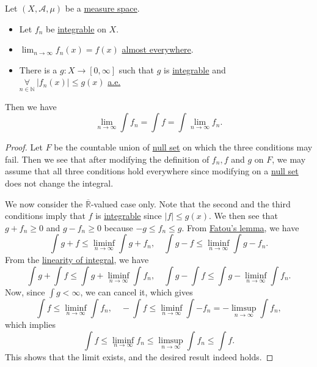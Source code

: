 \begin{theorem}\label{thm:DCT}
	Let \((X, \mathcal{A} , \mu )\) be a \hyperref[def:measure-space]{measure space}.
	\begin{itemize}
		\item Let \(f_{n}\) be \hyperref[def:integrable]{integrable} on \(X\).
		\item \(\lim_{n \to \infty} f_{n}(x) = f(x)\) \hyperref[def:mu-almost-everywhere]{almost everywhere}.
		\item There is a \(g\colon X\to [0, \infty ]\) such that \(g\) is \hyperref[def:integrable]{integrable} and \(\underset{n\in\mathbb{N} }{\forall }\ \left\vert f_{n}(x) \right\vert \leq g(x)\) \hyperref[def:mu-almost-everywhere]{a.e.}
	\end{itemize}
	Then we have
	\[
		\lim_{n \to \infty} \int f_{n} = \int f = \int \lim_{n \to \infty} f_{n}.
	\]
\end{theorem}
\begin{proof}
	Let \(F\) be the countable union of \hyperref[def:null-set]{null set} on which the three conditions may fail. Then we see that after modifying the definition of \(f_{n}, f\) and \(g\) on \(F\), we may assume that all three conditions hold everywhere since modifying on a \hyperref[def:null-set]{null set} does not change the integral.

	We now consider the \(\overline{\mathbb{R} }\)-valued case only. Note that the second and the third conditions imply that \(f\) is \hyperref[def:integrable]{integrable} since \(\left\vert f \right\vert \leq g(x)\). We then see that \(g + f_{n}\geq 0\) and \(g - f_{n}\geq 0\) because \(-g\leq f_{n}\leq g\). From \hyperref[thm:Fatou-lemma]{Fatou's lemma}, we have
	\[
		\int g + f \leq \liminf_{n \to \infty} \int g + f_{n},\quad \int g - f\leq \liminf_{n \to \infty} \int g - f_{n}.
	\]
	From the \hyperref[lma:linearity-of-integral]{linearity of integral}, we have
	\[
		\int g + \int f\leq \int g + \liminf_{n \to \infty} \int f_{n},\quad \int g - \int f \leq \int g - \liminf_{n \to \infty} \int f_{n}.
	\]
	Now, since \(\int g<\infty \), we can cancel it, which gives
	\[
		\int f \leq \liminf_{n \to \infty} \int f_{n},\quad -\int f \leq \liminf_{n \to \infty} \int -f_{n} = - \limsup_{n \to \infty} \int f_{n},
	\]
	which implies
	\[
		\int f \leq \liminf_{n \to \infty} f_{n}\leq \limsup_{n \to \infty} \int f_{n}\leq \int f.
	\]
	This shows that the limit exists, and the desired result indeed holds.
\end{proof}

